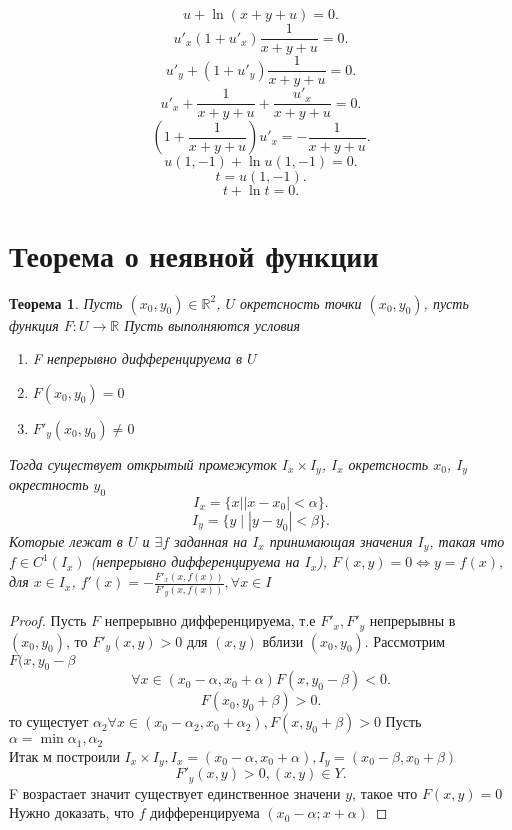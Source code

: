\documentclass[14pt]{extarticle} \usepackage{fontspec}
\newtheorem{theorem}{Теорема}
\begin{document}
\section{}
\[
    u + \ln{(x + y + u)} = 0
.\] 
\[
    u'_{x}  (1 + u'_{x}) \frac{1}{x + y+ u} = 0
.\] 
\[
u'_{y} + (1 + u'_{y}) \frac{1}{x + y +u} = 0
.\] 
\[
u'_{x} + \frac{1}{x + y + u} + \frac{u'_{x}}{x + y + u} = 0
.\] 
\[
    (1 + \frac{1}{x + y + u}) u'_{x} = -\frac{1}{x + y + u}
.\] 
\[
    u(1,-1) + \ln{u(1,-1)} = 0
.\] 
\[
t = u(1,-1)
.\] 
\[
    t + \ln{t} = 0
.\] 
\section{Теорема о неявной функции}
\begin{theorem}
    Пусть $(x_0,y_0) \in \mathbb{R}^2$, $U$ окретсность точки  $(x_0,y_0)$, пусть функция $F : U \to \mathbb{R}$ Пусть выполняются условия
    \begin{enumerate}
        \item F непрерывно дифференцируема в $U$
        \item  $F(x_0,y_0) = 0$
        \item $F'_{y} (x_0,y_0) \neq 0$
    \end{enumerate}
    Тогда существует открытый промежуток $I_{x} \times I_{y}$, $I_{x}$ окретсность $x_0$,  $I_{y}$ окрестность $y_0$
    \[
        I_{x} =  \{x | |x- x_0| <\alpha\}
    .\] 
    \[
        I_{y} = \{y \mid |y-y_0| < \beta\}
    .\] 
    Которые лежат в $U$ и  $\exists f$ заданная на $I_{x}$ принимающая значения $I_{y}$, такая что  $f \in C^{1}(I_{x})$ (непрерывно дифференцируема на $I_{x}$),
$F(x,y) = 0 \iff y = f(x), $ для  $x \in I_{x}$, $f'(x) = - \frac{F'_{x}(x,f(x))}{F'_{y}(x,f(x))}, \forall  x \in I_{}$
\end{theorem}
\begin{proof}
    Пусть $F$ непрерывно дифференцируема, т.е $F'_{x}, F'_{y}$ непрерывны в  $(x_0,y_0)$, то $F'_{y}(x,y) > 0$ для $(x,y)$ вблизи $(x_0,y_0)$. Рассмотрим $F(x,y_0 -\beta$
    \[
    \forall  x \in (x_0 -\alpha,x_0 + \alpha) F(x,y_0 -\beta) <0
    .\] 
    \[
    F(x_0,y_0 + \beta) > 0
    .\] 
    то сущестует $\alpha_2 \forall  x \in (x_0 - \alpha_2,x_0 + \alpha_2), F(x,y_0 + \beta) > 0$ Пусть $\alpha = \min{\alpha_1,\alpha_2}$\\
    Итак м построили $I_{x} \times I_{y}, I_{x} = (x_0 -\alpha,x_0+\alpha), I_{y}= (x_0 -\beta,x_0 + \beta)$
    \[
    F'_{y}(x,y) > 0 , (x,y) \in Y
    .\] 
    F возрастает значит существует единственное значени $y$, такое что  $F(x,y) =0$
    Нужно доказать, что $f$ дифференцируема  $(x_0 - \alpha;x+\alpha)$
\end{proof}
\end{document}

